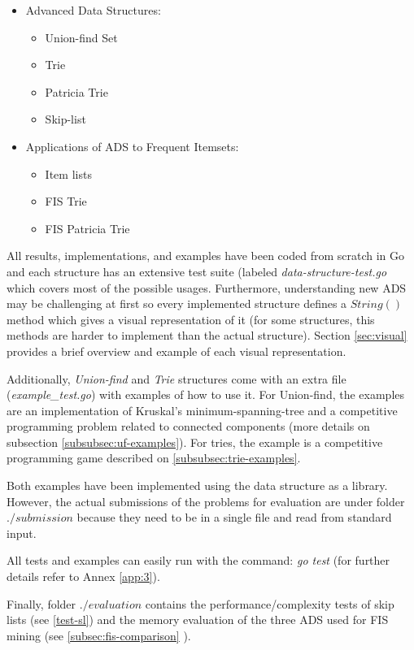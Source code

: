\documentclass[a4paper,10pt,table,xcdraw]{article}
\begin{document}
\begin{itemize}
\item Advanced Data Structures:
  \begin{itemize}
  \item Union-find Set
  \item Trie
  \item Patricia Trie
  \item Skip-list
\end{itemize}
\item Applications of ADS to Frequent Itemsets:
\begin{itemize}
  \item Item lists
  \item FIS Trie
  \item FIS Patricia Trie
\end{itemize}
\end{itemize}

All results, implementations, and examples have been coded from scratch in Go and each structure has an extensive test suite (labeled \textit{data-structure-test.go} which covers most of the possible usages. Furthermore, understanding new ADS may be challenging at first so every implemented structure defines a $String()$ method which gives a visual representation of it (for some structures, this methods are harder to implement than the actual structure). Section \ref{sec:visual} provides a brief overview and example of each visual representation.

Additionally, \textit{Union-find} and \textit{Trie} structures come with an extra file (\textit{example\_test.go}) with examples of how to use it. For Union-find, the examples are an implementation of Kruskal's \cite{Kruskal1956} minimum-spanning-tree and a competitive programming problem related to connected components (more details on subsection \ref{subsubsec:uf-examples}). For tries, the example is a competitive programming game described on \ref{subsubsec:trie-examples}. 

Both examples have been implemented using the data structure as a library. However, the actual submissions of the problems for evaluation are under folder $./submission$ because they need to be in a single file and read from standard input.

All tests and examples can easily run with the command: \textit{go test} (for further details refer to Annex \ref{app:3}).

Finally, folder $./evaluation$ contains the performance/complexity tests of skip lists (see \ref{test-sl}) and the memory evaluation of the three ADS used for FIS mining (see \ref{subsec:fis-comparison}
 ).
\end{document}
